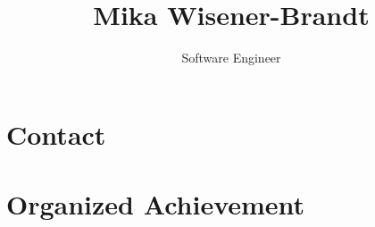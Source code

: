 \documentclass{article}
\title{Mika Wisener-Brandt}
\author{Software Engineer\vspace{-2.5ex}}
\date{\vspace{-5ex}}
\begin{document}
\maketitle

\section*{Contact}















\section*{Organized Achievement}













\end{document}

